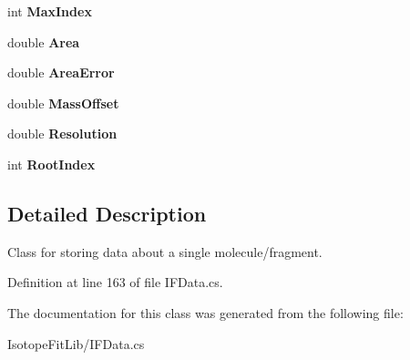 \begin{DoxyCompactItemize}
int {\bfseries Max\+Index}
\item 
\mbox{\label{class_isotope_fit_1_1_i_f_data_1_1_cluster_a884cb53417d13dfbe4e5c6dbcf8d3609}} 
double {\bfseries Area}
\item 
\mbox{\label{class_isotope_fit_1_1_i_f_data_1_1_cluster_ab06401869cf96a93bdf8dce8d79d8a0c}} 
double {\bfseries Area\+Error}
\item 
\mbox{\label{class_isotope_fit_1_1_i_f_data_1_1_cluster_afa64046ba8bdad51edc7ca5c1c39cd8c}} 
double {\bfseries Mass\+Offset}
\item 
\mbox{\label{class_isotope_fit_1_1_i_f_data_1_1_cluster_ad98e129dd08bfd98df4b474b4c9139f8}} 
double {\bfseries Resolution}
\item 
\mbox{\label{class_isotope_fit_1_1_i_f_data_1_1_cluster_a1060bc5b60218de0228335038eb5660d}} 
int {\bfseries Root\+Index}
\end{DoxyCompactItemize}


\subsection{Detailed Description}
Class for storing data about a single molecule/fragment. 



Definition at line 163 of file I\+F\+Data.\+cs.



The documentation for this class was generated from the following file\+:\begin{DoxyCompactItemize}
\item 
Isotope\+Fit\+Lib/I\+F\+Data.\+cs\end{DoxyCompactItemize}
